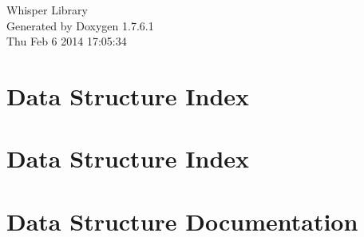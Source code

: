 \documentclass[a4paper]{book}
\begin{document}
\hypersetup{pageanchor=false,citecolor=blue}
\begin{titlepage}
\vspace*{7cm}
\begin{center}
{\Large \-Whisper \-Library }\\
\vspace*{1cm}
{\large \-Generated by Doxygen 1.7.6.1}\\
\vspace*{0.5cm}
{\small Thu Feb 6 2014 17:05:34}\\
\end{center}
\end{titlepage}
\clearemptydoublepage
{}
\tableofcontents
\clearemptydoublepage
{}
\hypersetup{pageanchor=true,citecolor=blue}
\chapter{\-Data \-Structure \-Index}

\chapter{\-Data \-Structure \-Index}

\chapter{\-Data \-Structure \-Documentation}











\printindex
\end{document}
